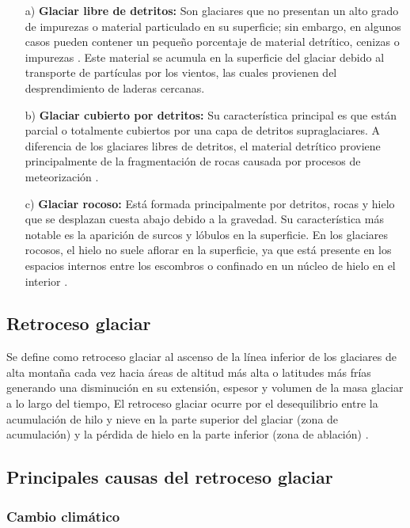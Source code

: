 	\begin{enumerate}
		\item[a)] \textbf{Glaciar libre de detritos:} Son glaciares que no presentan un alto grado de impurezas o material particulado en su superficie; sin embargo, en algunos casos pueden contener un pequeño porcentaje de material detrítico, cenizas o impurezas \parencite{lliboutry1956}. Este material se acumula en la superficie del glaciar debido al transporte de partículas por los vientos, las cuales provienen del desprendimiento de laderas cercanas.
		
		\item[b)] \textbf{Glaciar cubierto por detritos:} Su característica principal es que están parcial o totalmente cubiertos por una capa de detritos supraglaciares. A diferencia de los glaciares libres de detritos, el material detrítico proviene principalmente de la fragmentación de rocas causada por procesos de meteorización \parencite{anderson2016modeling}.
		
		\item[c)] \textbf{Glaciar rocoso:} Está formada principalmente por detritos, rocas y hielo que se desplazan cuesta abajo debido a la gravedad. Su característica más notable es la aparición de surcos y lóbulos en la superficie. En los glaciares rocosos, el hielo no suele aflorar en la superficie, ya que está presente en los espacios internos entre los escombros o confinado en un núcleo de hielo en el interior \parencite{potter1972ice}.
	\end{enumerate}
	
	\subsection{Retroceso glaciar}
	Se define como retroceso glaciar al ascenso de la línea inferior de los glaciares de alta montaña cada vez hacia áreas de altitud más alta o latitudes más frías generando una disminución en su extensión, espesor y volumen de la masa glaciar a lo largo del tiempo, El retroceso glaciar ocurre por el desequilibrio entre la acumulación de hilo y nieve en la parte superior del glaciar (zona de acumulación) y la pérdida de hielo en la parte inferior (zona de ablación) \parencite{delretroceso}.
	
	\subsection{Principales causas del retroceso glaciar}
	\subsubsection{Cambio climático}
	
